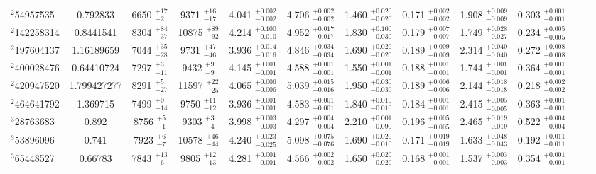 \begin{table}[htbp]
\begin{tabular}{lccccccccccc}
$^{2}$54957535 & 0.792833 & 6650  $_{- 2  }^{+ 17  }$& 9371  $_{- 17  }^{+ 16  }$& 4.041 $_{- 0.002 }^{+ 0.002 }$& 4.706 $_{- 0.002 }^{+ 0.002 }$& 1.460 $_{- 0.020 }^{+ 0.020 }$& 0.171 $_{- 0.002 }^{+ 0.002 }$& 1.908 $_{- 0.009 }^{+ 0.009 }$& 0.303 $_{- 0.001 }^{+ 0.001 }$\\
$^{2}$142258314 & 0.8441541 & 8304  $_{- 37  }^{+ 84  }$& 10875  $_{- 92  }^{+ 89  }$& 4.214 $_{- 0.010 }^{+ 0.100 }$& 4.952 $_{- 0.017 }^{+ 0.017 }$& 1.830 $_{- 0.030 }^{+ 0.100 }$& 0.179 $_{- 0.007 }^{+ 0.007 }$& 1.749 $_{- 0.027 }^{+ 0.028 }$& 0.234 $_{- 0.005 }^{+ 0.005 }$\\
$^{2}$197604137 & 1.16189659 & 7044  $_{- 28  }^{+ 35  }$& 9731  $_{- 46  }^{+ 47  }$& 3.936 $_{- 0.016 }^{+ 0.014 }$& 4.846 $_{- 0.034 }^{+ 0.034 }$& 1.690 $_{- 0.020 }^{+ 0.020 }$& 0.189 $_{- 0.009 }^{+ 0.009 }$& 2.314 $_{- 0.040 }^{+ 0.040 }$& 0.272 $_{- 0.008 }^{+ 0.008 }$\\
$^{2}$400028476 & 0.64410724 & 7297  $_{- 11  }^{+ 3  }$& 9432  $_{- 9  }^{+ 9  }$& 4.145 $_{- 0.001 }^{+ 0.001 }$& 4.588 $_{- 0.001 }^{+ 0.001 }$& 1.550 $_{- 0.001 }^{+ 0.001 }$& 0.188 $_{- 0.001 }^{+ 0.001 }$& 1.744 $_{- 0.001 }^{+ 0.001 }$& 0.364 $_{- 0.001 }^{+ 0.001 }$\\
$^{2}$420947520 & 1.799427277 & 8291  $_{- 27  }^{+ 5  }$& 11597  $_{- 25  }^{+ 22  }$& 4.065 $_{- 0.006 }^{+ 0.006 }$& 5.039 $_{- 0.016 }^{+ 0.015 }$& 1.950 $_{- 0.030 }^{+ 0.030 }$& 0.189 $_{- 0.006 }^{+ 0.006 }$& 2.144 $_{- 0.018 }^{+ 0.018 }$& 0.218 $_{- 0.002 }^{+ 0.002 }$\\
$^{2}$464641792 & 1.369715 & 7499  $_{- 14  }^{+ 0  }$& 9750  $_{- 12  }^{+ 11  }$& 3.936 $_{- 0.001 }^{+ 0.001 }$& 4.583 $_{- 0.001 }^{+ 0.001 }$& 1.840 $_{- 0.010 }^{+ 0.010 }$& 0.184 $_{- 0.001 }^{+ 0.001 }$& 2.415 $_{- 0.005 }^{+ 0.005 }$& 0.363 $_{- 0.001 }^{+ 0.001 }$\\
$^{3}$28763683 & 0.892 & 8756  $_{- 1  }^{+ 5  }$& 9303  $_{- 4  }^{+ 3  }$& 3.998 $_{- 0.003 }^{+ 0.003 }$& 4.297 $_{- 0.004 }^{+ 0.004 }$& 2.210 $_{- 0.090 }^{+ 0.001 }$& 0.196 $_{- 0.005 }^{+ 0.005 }$& 2.465 $_{- 0.019 }^{+ 0.019 }$& 0.522 $_{- 0.004 }^{+ 0.004 }$\\
$^{3}$53896096 & 0.741 & 7923  $_{- 7  }^{+ 6  }$& 10578  $_{- 44  }^{+ 46  }$& 4.240 $_{- 0.025 }^{+ 0.023 }$& 5.098 $_{- 0.076 }^{+ 0.075 }$& 1.690 $_{- 0.010 }^{+ 0.020 }$& 0.171 $_{- 0.019 }^{+ 0.019 }$& 1.633 $_{- 0.043 }^{+ 0.048 }$& 0.192 $_{- 0.011 }^{+ 0.011 }$\\
$^{3}$65448527 & 0.66783 & 7843  $_{- 6  }^{+ 13  }$& 9805  $_{- 13  }^{+ 12  }$& 4.281 $_{- 0.001 }^{+ 0.001 }$& 4.566 $_{- 0.002 }^{+ 0.002 }$& 1.650 $_{- 0.020 }^{+ 0.020 }$& 0.168 $_{- 0.001 }^{+ 0.001 }$& 1.537 $_{- 0.003 }^{+ 0.003 }$& 0.354 $_{- 0.001 }^{+ 0.001 }$\\

\end{tabular}
\end{table}
